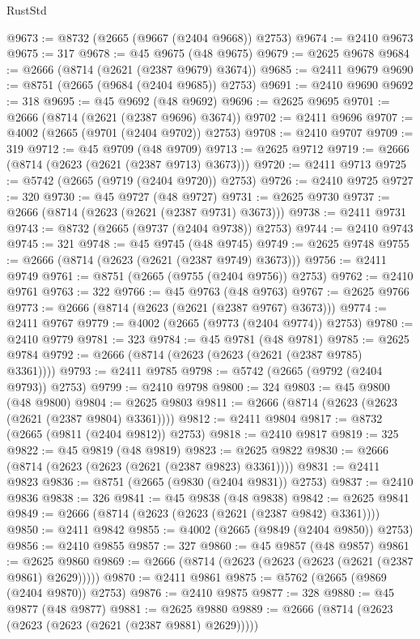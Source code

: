 \begin{lexlean}{RustStd}
\begin{coremodule}
@9673 := @8732 (@2665 (@9667 (@2404 @9668)) @2753)
@9674 := @2410 @9673
@9675 := 317
@9678 := @45 @9675 (@48 @9675)
@9679 := @2625 @9678
@9684 := @2666 (@8714 (@2621 (@2387 @9679) @3674))
@9685 := @2411 @9679
@9690 := @8751 (@2665 (@9684 (@2404 @9685)) @2753)
@9691 := @2410 @9690
@9692 := 318
@9695 := @45 @9692 (@48 @9692)
@9696 := @2625 @9695
@9701 := @2666 (@8714 (@2621 (@2387 @9696) @3674))
@9702 := @2411 @9696
@9707 := @4002 (@2665 (@9701 (@2404 @9702)) @2753)
@9708 := @2410 @9707
@9709 := 319
@9712 := @45 @9709 (@48 @9709)
@9713 := @2625 @9712
@9719 := @2666 (@8714 (@2623 (@2621 (@2387 @9713) @3673)))
@9720 := @2411 @9713
@9725 := @5742 (@2665 (@9719 (@2404 @9720)) @2753)
@9726 := @2410 @9725
@9727 := 320
@9730 := @45 @9727 (@48 @9727)
@9731 := @2625 @9730
@9737 := @2666 (@8714 (@2623 (@2621 (@2387 @9731) @3673)))
@9738 := @2411 @9731
@9743 := @8732 (@2665 (@9737 (@2404 @9738)) @2753)
@9744 := @2410 @9743
@9745 := 321
@9748 := @45 @9745 (@48 @9745)
@9749 := @2625 @9748
@9755 := @2666 (@8714 (@2623 (@2621 (@2387 @9749) @3673)))
@9756 := @2411 @9749
@9761 := @8751 (@2665 (@9755 (@2404 @9756)) @2753)
@9762 := @2410 @9761
@9763 := 322
@9766 := @45 @9763 (@48 @9763)
@9767 := @2625 @9766
@9773 := @2666 (@8714 (@2623 (@2621 (@2387 @9767) @3673)))
@9774 := @2411 @9767
@9779 := @4002 (@2665 (@9773 (@2404 @9774)) @2753)
@9780 := @2410 @9779
@9781 := 323
@9784 := @45 @9781 (@48 @9781)
@9785 := @2625 @9784
@9792 := @2666 (@8714 (@2623 (@2623 (@2621 (@2387 @9785) @3361))))
@9793 := @2411 @9785
@9798 := @5742 (@2665 (@9792 (@2404 @9793)) @2753)
@9799 := @2410 @9798
@9800 := 324
@9803 := @45 @9800 (@48 @9800)
@9804 := @2625 @9803
@9811 := @2666 (@8714 (@2623 (@2623 (@2621 (@2387 @9804) @3361))))
@9812 := @2411 @9804
@9817 := @8732 (@2665 (@9811 (@2404 @9812)) @2753)
@9818 := @2410 @9817
@9819 := 325
@9822 := @45 @9819 (@48 @9819)
@9823 := @2625 @9822
@9830 := @2666 (@8714 (@2623 (@2623 (@2621 (@2387 @9823) @3361))))
@9831 := @2411 @9823
@9836 := @8751 (@2665 (@9830 (@2404 @9831)) @2753)
@9837 := @2410 @9836
@9838 := 326
@9841 := @45 @9838 (@48 @9838)
@9842 := @2625 @9841
@9849 := @2666 (@8714 (@2623 (@2623 (@2621 (@2387 @9842) @3361))))
@9850 := @2411 @9842
@9855 := @4002 (@2665 (@9849 (@2404 @9850)) @2753)
@9856 := @2410 @9855
@9857 := 327
@9860 := @45 @9857 (@48 @9857)
@9861 := @2625 @9860
@9869 := @2666 (@8714 (@2623 (@2623 (@2623 (@2621 (@2387 @9861) @2629)))))
@9870 := @2411 @9861
@9875 := @5762 (@2665 (@9869 (@2404 @9870)) @2753)
@9876 := @2410 @9875
@9877 := 328
@9880 := @45 @9877 (@48 @9877)
@9881 := @2625 @9880
@9889 := @2666 (@8714 (@2623 (@2623 (@2623 (@2621 (@2387 @9881) @2629)))))

\end{coremodule}
\end{lexlean}

